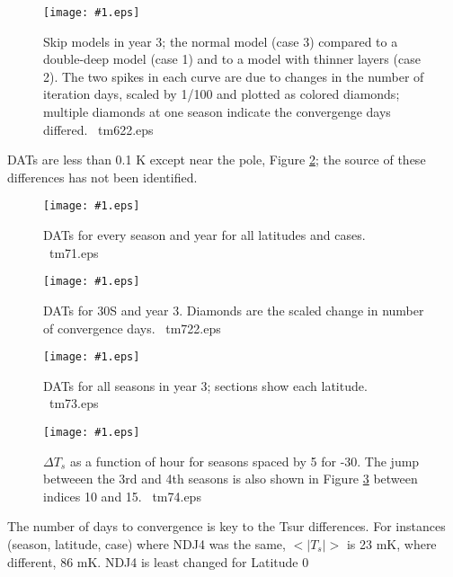 \documentclass{article}  %
\newcommand{\igc}[1]{\texttt{[image: \#1.eps]}}  %
\begin{document}
\begin{figure}[!ht] \igc{tm622}
\caption[Deep or thin]{Skip models in year 3; the normal model (case 3) compared
  to a double-deep model (case 1) and to a model with thinner layers (case
  2). The two spikes in each curve are due to changes in the number of iteration
  days, scaled by 1/100 and plotted as colored diamonds; multiple diamonds at
  one season indicate the convergenge days differed.  \ tm622.eps \label{tm622}
} \end{figure}

DATs are less than 0.1 K except near the pole, Figure \ref{tm71}; the source of
these differences has not been identified.
 
\begin{figure}[!ht] \igc{tm71}
\caption[All DATs]{DATs for every season and year for all latitudes and cases.
  \ tm71.eps \label{tm71} } \end{figure}


\begin{figure}[!ht]  \igc{tm722}
\caption[DATs at 30\qd S, year 3]{DATs for 30\qd S and year 3. Diamonds are the
  scaled change in number of convergence days. \ tm722.eps \label{tm722}
} \end{figure}


\begin{figure}[!ht] \igc{tm73}
\caption[DATs year 3 each Lat.]{DATs for all seasons in year 3; sections show
  each latitude.  \ tm73.eps \label{tm73} } \end{figure}


\begin{figure}[!ht] \igc{tm74}
\caption[$\Delta T_s$ vrs hour]{$\Delta T_s$ as a function of hour for seasons
  spaced by 5 for -30\qd. The jump betweeen the 3rd and 4th seasons is also
  shown in Figure \ref{tm722} between indices 10 and 15.
  \ tm74.eps \label{tm74} } \end{figure}


The number of days to convergence is key to the Tsur differences. For instances
(season, latitude, case) where NDJ4 was the same, $<|T_s|>$ is 23 mK, where
different, 86 mK. NDJ4 is least changed for Latitude 0
\end{document}
